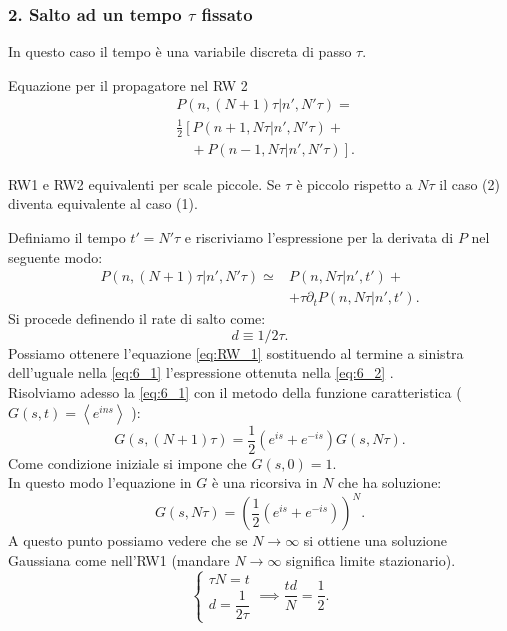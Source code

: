 \subsubsection{2. Salto ad un tempo $\tau$ fissato}%
\label{subsub:2. Salto ad un tempo tau fissato}
In questo caso il tempo è una variabile discreta di passo $\tau$.
\begin{bluebox}{Equazione per il propagatore nel RW 2}
\begin{align}
    &P( n,(N+1) \tau |  n',N'\tau ) = \nonumber \\
			       & \frac{1}{2} \left[ P\left( n+1,N\tau |n',N'\tau \right) \right. +  \nonumber \\
			       & \quad + \left.  P\left(n-1,N\tau |n',N'\tau\right) \right] \label{eq:6_1}
.\end{align}
\end{bluebox}
\noindent
\begin{greenbox}{RW1 e RW2 equivalenti per scale piccole.}
 Se $\tau$ è piccolo rispetto a $N\tau$ il caso (2) diventa equivalente al caso (1).   
\end{greenbox}
\noindent
Definiamo il tempo $t' = N'\tau$ e riscriviamo l'espressione per la derivata di $P$ nel seguente modo:
\begin{equation}
\begin{aligned}
    P\left(n,(N+1) \tau|n',N'\tau\right)\simeq & P\left(n,N\tau|n',t'\right) + \\
					       & + \tau\partial_{t}P\left(n,N\tau|n',t'\right) \label{eq:6_2}
.\end{aligned}
\end{equation}
Si procede definendo il rate di salto come: 
\[
 d \equiv 1 /2\tau   
.\] 
Possiamo ottenere l'equazione \ref{eq:RW_1} sostituendo al termine a sinistra dell'uguale nella \ref{eq:6_1} l'espressione ottenuta nella \ref{eq:6_2} .\\
Risolviamo adesso la \ref{eq:6_1} con il metodo della funzione caratteristica ($G(s,t) = \left<e^{ins}\right>$ ):
\[
    G(s, (N+1)\tau) = \frac{1}{2}\left(e^{is}+ e^{-is}\right)G(s,N\tau) 
.\] 
Come condizione iniziale si impone che $G(s,0) = 1$.\\
In questo modo l'equazione in $G$ è una ricorsiva in $N$ che ha soluzione:
\[
    G(s,N\tau) = \left(\frac{1}{2}\left(e^{is}+e^{-is}\right)\right)^{N}
.\] 
A questo punto possiamo vedere che se $N\to \infty$ si ottiene una soluzione Gaussiana come nell'RW1 (mandare $N\to \infty$ significa limite stazionario).
\[
    \begin{cases}
        \tau N = t\\
	d = \dfrac{1}{2\tau}
    \end{cases}
    \implies  
    \frac{td}{N} = \frac{1}{2}
.\] 
